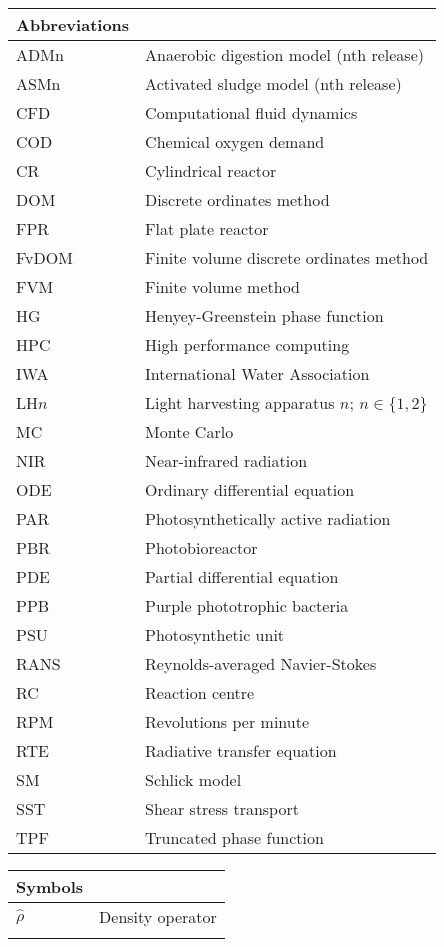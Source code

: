 \begin{center}
	\small
	\begin{longtable}{ll}
	\toprule
	Abbreviations & {} \\
	\bottomrule
ADMn &	Anaerobic digestion model (nth release) \\
ASMn &	Activated sludge model (nth release) \\
CFD &	Computational fluid dynamics \\
COD &	Chemical oxygen demand \\
CR &	Cylindrical reactor \\
DOM &	Discrete ordinates method \\
FPR &	Flat plate reactor \\
FvDOM &	Finite volume discrete ordinates method \\
FVM &	Finite volume method \\
HG &	Henyey-Greenstein phase function \\
HPC &	High performance computing \\
IWA &	International Water Association \\
LH$n$ &   Light harvesting apparatus $n$; $n \in \{1, 2\}$ \\
MC &	Monte Carlo \\
NIR &   Near-infrared radiation \\
ODE &	Ordinary differential equation \\
PAR &	Photosynthetically active radiation \\
PBR &	Photobioreactor \\
PDE &	Partial differential equation \\
PPB &	Purple phototrophic bacteria \\
PSU &	Photosynthetic unit \\
RANS &	Reynolds-averaged Navier-Stokes \\
RC  &  Reaction centre \\
RPM &	Revolutions per minute \\
RTE &	Radiative transfer equation \\
SM  &	Schlick model \\
SST &	Shear stress transport \\
TPF &	Truncated phase function \\
	\hline
	\end{longtable}
\end{center}

\begin{center}
	\small
	\begin{longtable}{ll}
	\toprule
	Symbols & {} \\
	\bottomrule
	$\hat{\rho}$		& Density operator \\
	\etc{}					& \etc{} \\
	\hline
	\end{longtable}
\end{center}

